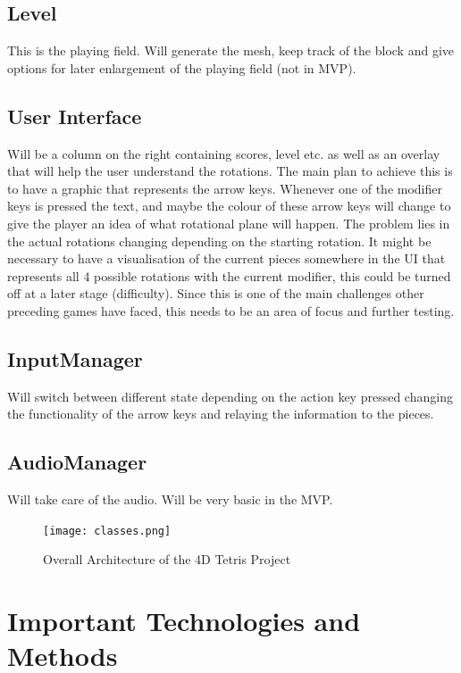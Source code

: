 \documentclass{article}
\begin{document}
\subsection{Level}
This is the playing field. Will generate the mesh, keep track of the block and give options for later enlargement of the playing field (not in MVP).
\subsection{User Interface}
Will be a column on the right containing scores, level etc. as well as an overlay that will help the user understand the rotations.
The main plan to achieve this is to have a graphic that represents the arrow keys. Whenever one of the modifier keys is pressed the text, and maybe the colour of these arrow keys will change to give the player an idea of what rotational plane will happen. The problem lies in the actual rotations changing depending on the starting rotation. It might be necessary to have a visualisation of the current pieces somewhere in the UI that represents all 4 possible rotations with the current modifier, this could be turned off at a later stage (difficulty). Since this is one of the main challenges other preceding games have faced, this needs to be an area of focus and further testing. 
\subsection{InputManager}
Will switch between different state depending on the action key pressed changing the functionality of the arrow keys and relaying the information to the pieces.
\subsection{AudioManager}
Will take care of the audio. Will be very basic in the MVP.


\begin{figure}[H]
    \centering
    \texttt{[image: classes.png]}
    \caption{Overall Architecture of the 4D Tetris Project}
    \label{fig:architecture}
\end{figure}

\section{Important Technologies and Methods}
\end{document}
